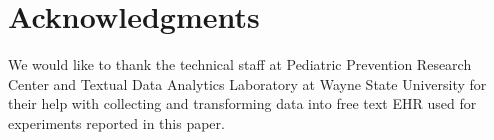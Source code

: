 \documentclass{amia}
\begin{document}
\section*{Acknowledgments}
We would like to thank the technical staff at Pediatric Prevention Research Center and Textual Data Analytics Laboratory at Wayne State University for their help with collecting and transforming data into free text EHR used for experiments reported in this paper. 



\end{document}
